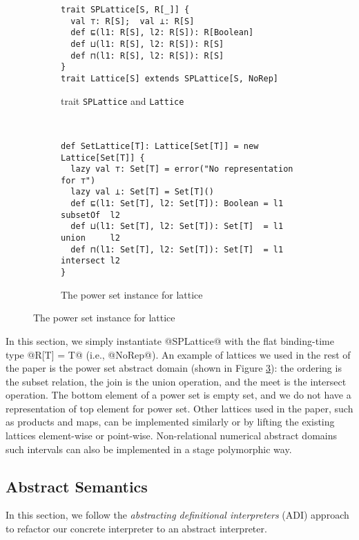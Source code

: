 \begin{figure}[h!]
  \centering
  \begin{subfigure}[b]{0.45\textwidth}
  \begin{lstlisting}[style=small]
trait SPLattice[S, R[_]] {
  val ⊤: R[S];  val ⊥: R[S]
  def ⊑(l1: R[S], l2: R[S]): R[Boolean]
  def ⊔(l1: R[S], l2: R[S]): R[S]
  def ⊓(l1: R[S], l2: R[S]): R[S]
}
trait Lattice[S] extends SPLattice[S, NoRep]
  \end{lstlisting}
  \caption{trait \texttt{SPLattice} and \texttt{Lattice}} \label{fig:splattice}
  \end{subfigure}
  ~
  \begin{subfigure}[b]{0.6\textwidth}
\begin{lstlisting}[style=small]
def SetLattice[T]: Lattice[Set[T]] = new Lattice[Set[T]] {
  lazy val ⊤: Set[T] = error("No representation for ⊤")
  lazy val ⊥: Set[T] = Set[T]()
  def ⊑(l1: Set[T], l2: Set[T]): Boolean = l1 subsetOf  l2
  def ⊔(l1: Set[T], l2: Set[T]): Set[T]  = l1 union     l2
  def ⊓(l1: Set[T], l2: Set[T]): Set[T]  = l1 intersect l2
}
\end{lstlisting}
  \caption{The power set instance for lattice} \label{fig:powerset}
\end{subfigure}
\end{figure}

In this section, we simply instantiate @SPLattice@ with the flat binding-time
type @R[T] = T@ (i.e., @NoRep@).
An example of lattices we used in the rest of the paper is the power set
abstract domain (shown in Figure \ref{fig:powerset}): the ordering is the subset
relation, the join is the union operation, and the meet is the intersect
operation. The bottom element of a power set is empty set, and we do not have a
representation of top element for power set.  Other lattices used in the paper, such as
products and maps, can be implemented similarly or by lifting the existing
lattices element-wise or point-wise. Non-relational numerical abstract domains
such intervals can also be implemented in a stage polymorphic way.

\subsection{Abstract Semantics}

In this section, we follow the \textit{abstracting definitional interpreters}
(ADI) approach \cite{DBLP:journals/pacmpl/DaraisLNH17} to refactor our concrete
interpreter to an abstract interpreter.


